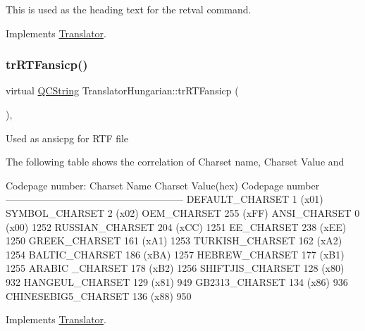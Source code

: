 This is used as the heading text for the retval command. 

Implements \mbox{\hyperlink{class_translator}{Translator}}.

\mbox{\label{class_translator_hungarian_aa3e8143837bae2721e36eff9ac36d120}} 
\subsubsection{\texorpdfstring{trRTFansicp()}{trRTFansicp()}}
{\footnotesize\ttfamily virtual \mbox{\hyperlink{class_q_c_string}{Q\+C\+String}} Translator\+Hungarian\+::tr\+R\+T\+Fansicp (\begin{DoxyParamCaption}{ }\end{DoxyParamCaption})\hspace{0.3cm}{\ttfamily [inline]}, {\ttfamily [virtual]}}

Used as ansicpg for R\+TF file

The following table shows the correlation of Charset name, Charset Value and 
\begin{DoxyPre}
Codepage number:
Charset Name       Charset Value(hex)  Codepage number
------------------------------------------------------
DEFAULT\_CHARSET           1 (x01)
SYMBOL\_CHARSET            2 (x02)
OEM\_CHARSET             255 (xFF)
ANSI\_CHARSET              0 (x00)            1252
RUSSIAN\_CHARSET         204 (xCC)            1251
EE\_CHARSET              238 (xEE)            1250
GREEK\_CHARSET           161 (xA1)            1253
TURKISH\_CHARSET         162 (xA2)            1254
BALTIC\_CHARSET          186 (xBA)            1257
HEBREW\_CHARSET          177 (xB1)            1255
ARABIC \_CHARSET         178 (xB2)            1256
SHIFTJIS\_CHARSET        128 (x80)             932
HANGEUL\_CHARSET         129 (x81)             949
GB2313\_CHARSET          134 (x86)             936
CHINESEBIG5\_CHARSET     136 (x88)             950
\end{DoxyPre}
 

Implements \mbox{\hyperlink{class_translator_a9953a4c0e6a4fc7d017abcd5c2939e0f}{Translator}}.

\mbox{\label{class_translator_hungarian_a014b331cc67eeb168b98f0bc6270fdff}} 

